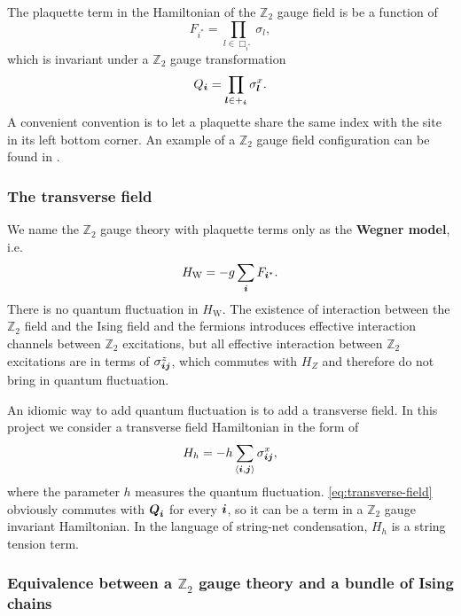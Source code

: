 \documentclass[hyperref, a4paper]{article}
\newcommand*{\pair}[1]{\langle #1 \rangle}
\newcommand*{\concept}[1]{{\textbf{#1}}}
\begin{document}
The plaquette term in the Hamiltonian of the $\mathbb{Z}_2$ gauge field is be a function of
\begin{equation}
    F_{i^*} = \prod_{l \in \Box_{i^*}} \sigma_l,
\end{equation}
which is invariant under a $\mathbb{Z}_2$ gauge transformation
\begin{equation}
    Q_{\vb*{i}} = \prod_{\vb*{l} \in +_{\vb*{i}}} \sigma^x_{\vb*{l}}.
\end{equation}
A convenient convention is to let a plaquette share the same index with the site in its left bottom corner. 
An example of a $\mathbb{Z}_2$ gauge field configuration can be found in .

\subsubsection{The transverse field}

We name the $\mathbb{Z}_2$ gauge theory with plaquette terms only as the \concept{Wegner model}, i.e.
\begin{equation}
    H_\text{W} = - g \sum_{\vb*{i}} F_{{\vb*{i}}^*}.
\end{equation}
There is no quantum fluctuation in $H_\text{W}$. The existence of interaction between the $\mathbb{Z}_2$ field and the Ising field and the fermions introduces effective interaction channels between $\mathbb{Z}_2$ excitations, but all effective interaction between $\mathbb{Z}_2$ excitations are in terms of $\sigma^z_{\vb*{i} \vb*{j}}$, which commutes with $H_Z$ and therefore do not bring in quantum fluctuation.

An idiomic way to add quantum fluctuation is to add a transverse field.
In this project we consider a transverse field Hamiltonian in the form of 
\begin{equation}
    H_h = - h \sum_{\pair{\vb*{i}, \vb*{j}}} \sigma_{\vb*{i} \vb*{j}}^x ,
    \label{eq:transverse-field}
\end{equation}
where the parameter $h$ measures the quantum fluctuation.
\eqref{eq:transverse-field} obviously commutes with $\vb*{Q}_{\vb*{i}}$ for every $\vb*{i}$, so it can be a term in a $\mathbb{Z}_2$ gauge invariant Hamiltonian. 
In the language of string-net condensation, $H_h$ is a string tension term.

\subsubsection{Equivalence between a $\mathbb{Z}_2$ gauge theory and a bundle of Ising chains}
\end{document}
